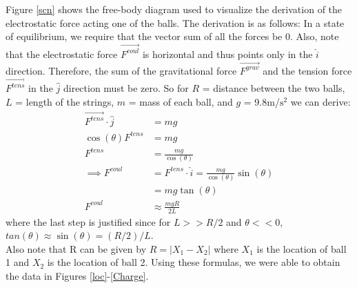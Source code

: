 \documentclass[oneside,12pt]{amsart}
\begin{document}
	\indent Figure \ref{scn} shows the free-body diagram used to visualize the derivation of the electrostatic force acting one of the balls. The derivation is as follows: In a state of equilibrium, we require that the vector sum of all the forces be 0. Also, note that the electrostatic force $\vec{F^{coul}}$ is horizontal and thus points only in the $\hat{i}$ direction. Therefore, the sum of the gravitational force $\vec{F^{grav}}$ and the tension force $\vec{F^{tens}}$ in the $\hat{j}$ direction must be zero. So for $R$ = distance between the two balls, $L$ = length of the strings, $m$ = mass of each ball, and $g$ = 9.8m/$\text{s}^2$ we can derive:
	\begin{align*}
		\vec{F^{tens}} \cdot \hat{j} &= mg\\
		\cos(\theta)F^{tens} &= mg\\
		F^{tens} &= \frac{mg}{\cos(\theta)}\\
		\implies F^{coul} &= F^{tens}\cdot \hat{i} = \frac{mg}{\cos(\theta)}\sin(\theta)\\
		&=mg\tan(\theta)\\
		F^{coul} &\approx \frac{mgR}{2L}
	\end{align*}
	where the last step is justified since for $L>>R/2$ and $\theta << 0$, $tan(\theta) \approx \sin(\theta) = (R/2)/L$.\\
	
	\indent Also note that R can be given by $R = |X_1-X_2|$ where $X_1$ is the location of ball 1 and $X_2$ is the location of ball 2. Using these formulas, we were able to obtain the data in Figures \ref{loc}-\ref{Charge}.\\
	 
\end{document}
